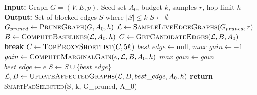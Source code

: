 \documentclass[11pt]{article}
\begin{document}
\begin{algorithm}[H]
\caption{Reachability-Delta Greedy Solver}
\begin{algorithmic}[1]
\State \textbf{Input:} Graph $G=(V,E,p)$, Seed set $A_0$, budget $k$, samples $r$, hop limit $h$
\State \textbf{Output:} Set of blocked edges $S$ where $|S| \leq k$
\State $S \gets \emptyset$
\State $G_{pruned} \gets \textsc{PruneGraph}(G, A_0, h)$ 
\State $\mathcal{L} \gets \textsc{SampleLiveEdgeGraphs}(G_{pruned}, r)$ 
\State $B \gets \textsc{ComputeBaselines}(\mathcal{L}, A_0, h)$ 
    \State $C \gets \textsc{GetCandidateEdges}(\mathcal{L}, B, A_0)$ 
     \textbf{break} \EndIf
        \State $C \gets \textsc{TopProxyShortlist}(C, 5k)$ 
    \EndIf
    \State $best\_edge \gets \text{null}$, $max\_gain \gets -1$
        \State $gain \gets \textsc{ComputeMarginalGain}(e, \mathcal{L}, B, A_0, h)$ 
            \State $max\_gain \gets gain$
            \State $best\_edge \gets e$
        \EndIf
    \EndFor
    \State $S \gets S \cup \{best\_edge\}$
    \State $\mathcal{L}, B \gets \textsc{UpdateAffectedGraphs}(\mathcal{L}, B, best\_edge, A_0, h)$
\EndFor
\State \textbf{return} \textsc{SmartPadSelected}(S, k, G_{pruned}, A_0) 
\end{algorithmic}
\end{algorithm}
\end{document}
